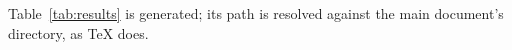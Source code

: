 Table~\ref{tab:results} is generated; its path is resolved against the main
document's directory, as TeX does.

